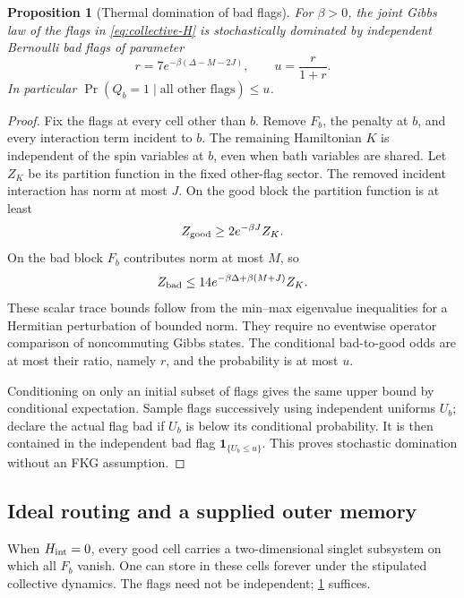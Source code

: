 \documentclass[11pt,reqno]{amsart}
\numberwithin{equation}{section}
\newtheorem{proposition}[theorem]{Proposition}
\theoremstyle{definition}
\theoremstyle{remark}
\newcommand{\one}{\mathbf 1}
\begin{document}
\begin{proposition}[Thermal domination of bad flags]\label{prop:flags}
For \(\beta>0\), the joint Gibbs law of the flags in
\eqref{eq:collective-H} is stochastically dominated by independent
Bernoulli bad flags of parameter
\begin{equation}\label{eq:u}
 r=7e^{-\beta(\Delta-M-2J)},\qquad u=\frac r{1+r}.
\end{equation}
In particular \(\Pr(Q_b=1\mid\text{all other flags})\le u\).
\end{proposition}
\begin{proof}
Fix the flags at every cell other than \(b\).
Remove \(F_b\), the penalty at \(b\), and every interaction term
incident to \(b\). The remaining Hamiltonian \(K\) is independent
of the spin variables at \(b\), even when bath variables are shared.
Let \(Z_K\) be its partition function in the fixed other-flag sector.
The removed incident interaction has norm at most \(J\).
On the good block the partition function is at least
\[
                           Z_{\rm good}\ge 2e^{-\beta J}Z_K.
\]
On the bad block \(F_b\) contributes norm at most \(M\), so
\[
             Z_{\rm bad}\le14e^{-\beta\Delta+\beta(M+J)}Z_K.
\]
These scalar trace bounds follow from the min--max eigenvalue
inequalities for a Hermitian perturbation of bounded norm.
They require no eventwise operator comparison of noncommuting Gibbs
states. The conditional bad-to-good odds are at most their ratio,
namely \(r\), and the probability is at most \(u\).

Conditioning on only an initial subset of flags gives the same upper
bound by conditional expectation. Sample flags successively using
independent uniforms \(U_b\); declare the actual flag bad if \(U_b\)
is below its conditional probability. It is then contained in the
independent bad flag \(\one_{\{U_b\le u\}}\).
This proves stochastic domination without an FKG assumption.
\end{proof}

\subsection{Ideal routing and a supplied outer memory}

When \(H_{\rm int}=0\), every good cell carries a two-dimensional
singlet subsystem on which all \(F_b\) vanish. One can store in
these cells forever under the stipulated collective dynamics.
The flags need not be independent; \cref{prop:flags} suffices.
\end{document}
